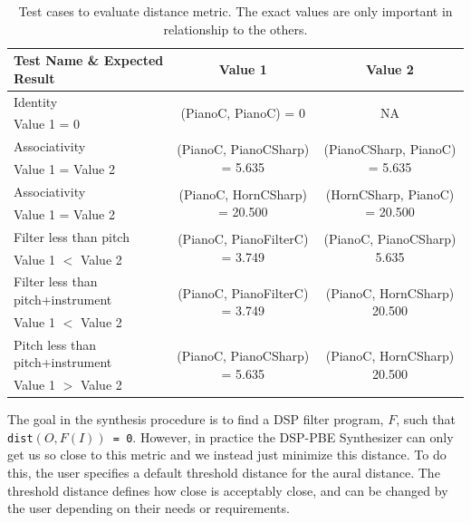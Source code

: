\begin{table}[!h]
\centering
\begin{tabular}{|l | c | c|} 
 \hline
 Test Name \& Expected Result & Value 1 & Value 2 \\
 \hline
 \hline
 Identity & \multirow{2}{*}{(PianoC, PianoC) = 0} & \multirow{2}{*}{NA}\\ 
   \quad Value 1 = 0 &  & \\
 \hline
 Associativity & \multirow{2}{*}{(PianoC, PianoCSharp) = 5.635} & \multirow{2}{*}{(PianoCSharp, PianoC) = 5.635} \\
   \quad Value 1 = Value 2  & & \\
 \hline
 Associativity & \multirow{2}{*}{(PianoC, HornCSharp) = 20.500} & \multirow{2}{*}{(HornCSharp, PianoC) = 20.500} \\
   \quad  Value 1 = Value 2 & & \\
 \hline
 Filter less than pitch & \multirow{2}{*}{(PianoC, PianoFilterC) = 3.749} & \multirow{2}{*}{(PianoC, PianoCSharp) 5.635} \\ 
   \quad Value 1 $<$ Value 2 & & \\
 \hline
 Filter less than pitch+instrument & \multirow{2}{*}{(PianoC, PianoFilterC) = 3.749} & \multirow{2}{*}{(PianoC, HornCSharp) 20.500} \\
   \quad Value 1 $<$ Value 2 & & \\
 \hline
 Pitch less than pitch+instrument & \multirow{2}{*}{(PianoC, PianoCSharp) = 5.635} & \multirow{2}{*}{(PianoC, HornCSharp) 20.500} \\
   \quad Value 1 $>$ Value 2 & & \\
 \hline
\end{tabular}
\caption{Test cases to evaluate distance metric. The exact values are only important in relationship to the others.}
\label{table:dist}
\end{table}


The goal in the synthesis procedure is to find a DSP filter program, $F$, such that \texttt{dist$(O, F(I))$ = 0}.
However, in practice the DSP-PBE Synthesizer can only get us so close to this metric and we instead just minimize this distance.
To do this, the user specifies a default threshold distance for the aural distance.
The threshold distance defines how close is acceptably close, and can be changed by the user depending on their needs or requirements.

